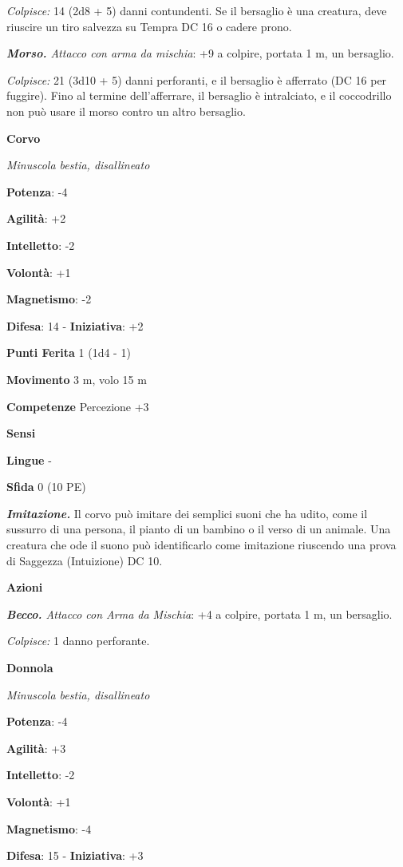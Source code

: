 \begin{multicols}{2}
\emph{Colpisce:} 14 (2d8 + 5) danni contundenti. Se il bersaglio è una
creatura, deve riuscire un tiro salvezza su Tempra DC 16 o cadere prono.

\emph{\textbf{Morso.} Attacco con arma da mischia}: +9 a colpire,
portata 1 m, un bersaglio.

\emph{Colpisce:} 21 (3d10 + 5) danni perforanti, e il bersaglio è
afferrato (DC 16 per fuggire). Fino al termine dell'afferrare, il
bersaglio è intralciato, e il coccodrillo non può usare il morso contro
un altro bersaglio.

\textbf{Corvo}

\emph{Minuscola bestia, disallineato}

\textbf{Potenza}: -4

\textbf{Agilità}: +2

\textbf{Intelletto}: -2

\textbf{Volontà}: +1

\textbf{Magnetismo}: -2

\textbf{Difesa}: 14 - \textbf{Iniziativa}: +2

\textbf{Punti Ferita} 1 (1d4 - 1)

\textbf{Movimento} 3 m, volo 15 m

\textbf{Competenze} Percezione +3

\textbf{Sensi} 

\textbf{Lingue} -

\textbf{Sfida} 0 (10 PE)\smallskip

\emph{\textbf{Imitazione.}} Il corvo può imitare dei semplici suoni che
ha udito, come il sussurro di una persona, il pianto di un bambino o il
verso di un animale. Una creatura che ode il suono può identificarlo
come imitazione riuscendo una prova di Saggezza (Intuizione) DC 10.

\smallskip\textbf{Azioni}

\emph{\textbf{Becco.} Attacco con Arma da Mischia}: +4 a colpire,
portata 1 m, un bersaglio.

\emph{Colpisce:} 1 danno perforante.

\textbf{Donnola}

\emph{Minuscola bestia, disallineato}

\textbf{Potenza}: -4

\textbf{Agilità}: +3

\textbf{Intelletto}: -2

\textbf{Volontà}: +1

\textbf{Magnetismo}: -4

\textbf{Difesa}: 15 - \textbf{Iniziativa}: +3


\end{multicols}
